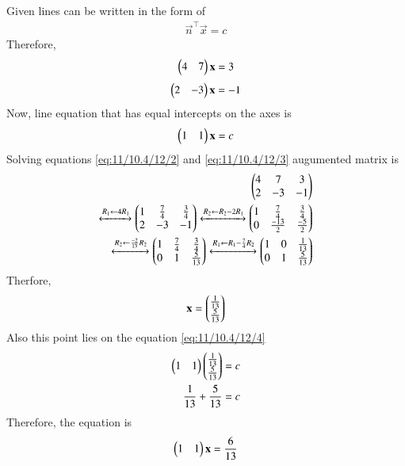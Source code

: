 Given lines can be written in the form of \begin{align}
        \Vec{n}^{\top}\Vec{x} = c
    \end{align}
   Therefore,
		\begin{align}
       \myvec{4&7}\vec{x}=3
       \label{eq:11/10.4/12/2}
   \end{align} 
   \begin{align}
       \myvec{2&-3}\vec{x}=-1
       \label{eq:11/10.4/12/3}
   \end{align}
   Now, line equation that has equal intercepts on the axes is
   \begin{align}
       \myvec{1 & 1}\Vec{x}=c
       \label{eq:11/10.4/12/4}
   \end{align}
   Solving equations \eqref{eq:11/10.4/12/2} and \eqref{eq:11/10.4/12/3}
		augumented matrix is
 \begin{align}
    \begin{pmatrix}4&7&3\\2&-3&-1\end{pmatrix}\\
    \xleftrightarrow{R_1 \leftarrow 4 R_1}
    \begin{pmatrix}1&\frac{7}{4}&\frac{3}{4}\\2&-3&-1\end{pmatrix}
    \xleftrightarrow{R_2 \leftarrow R_2 - 2R_1}
    \begin{pmatrix}1&\frac{7}{4}&\frac{3}{4}\\0&\frac{-13}{2}&\frac{-5}{2}\end{pmatrix}\\
    \xleftrightarrow{R_2 \leftarrow \frac{-2}{13}R_2}
    \begin{pmatrix}1&\frac{7}{4}&\frac{3}{4}\\0&1&\frac{5}{13}\end{pmatrix}
    \xleftrightarrow{R_1 \leftarrow R_1-\frac{7}{4}R_2}
    \begin{pmatrix}1&0&\frac{1}{13}\\0&1&\frac{5}{13}\end{pmatrix}
\end{align}
Therfore, \begin{align}    
\mathbf{x} = \begin{pmatrix}\frac{1}{13}\\\frac{5}{13}\end{pmatrix}
\end{align}
Also this point lies on the equation \eqref{eq:11/10.4/12/4}
\begin{align}
    \begin{pmatrix}1 & 1\end{pmatrix}\begin{pmatrix}\frac{1}{13}\\\frac{5}{13}\end{pmatrix} = c\\
    \frac{1}{13}+\frac{5}{13} = c
    \end{align}
    Therefore, the equation is \begin{align}
        \myvec{1&1}\Vec{x}=\frac{6}{13}
    \end{align}
